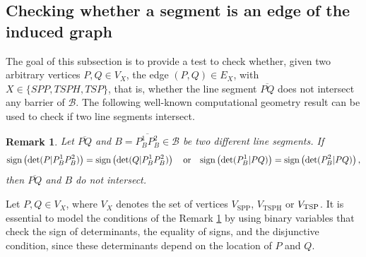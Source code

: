 \documentclass[a4paper,  review, authoryear, 1p.]{elsarticle}
\newcommand{\VSPP}{{V_{\text{SPP}}}}
\newcommand{\VTSPH}{{V_{\text{TSPH}}}}
\newtheorem{remark}{Remark}
\newcommand{\determinant}[3]{\det({#1|#2#3})}
\begin{document}
	
	\subsection{Checking whether a segment is an edge of the induced graph}
	
	The goal of this subsection is to provide a test to check whether, given two arbitrary vertices $P, Q\in V_X$, the edge $(P, Q)\in E_X$, with $X\in\{SPP, TSPH, TSP\}$, that is, whether the line segment $\overline{PQ}$ does not intersect any barrier of $\mathcal B$. The following well-known computational geometry result can be used to check if two line segments intersect.
	
	
	\begin{remark}\label{rem:determinants}
		Let $\overline{PQ}$ and $B=\overline{P_B^1P_B^2}\in\mathcal B$ be two different line segments. 
		If
		\begin{equation*}
			\normalfont{\text{sign}}\left(\determinant{P}{P_B^1}{P_B^2}\right) = \normalfont{\text{sign}}\left(\determinant{Q}{P_B^1}{P_B^2}\right)
			\quad
			\text{or}
			\quad
			\normalfont{\text{sign}}\left(\determinant{P_B^1}{P}{Q}\right) = \normalfont{\text{sign}}\left(\determinant{P_B^2}{P}{Q}\right)
			,
		\end{equation*}
		then $\overline{PQ}$ and $B$ do not intersect.
	\end{remark}
	
	
	
	
	Let $P,Q\in V_X$, where $V_X$ denotes the set of vertices $\VSPP$, $\VTSPH$ or $V_{\rm{TSP}}$. It is essential to model the conditions of the Remark \ref{rem:determinants} by using binary variables that check the sign of determinants, the equality of signs, and the disjunctive condition, since these determinants depend on the location of $P$ and $Q$.
	
\end{document}
